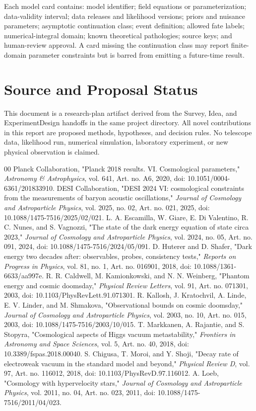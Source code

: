 \documentclass[conference]{IEEEtran}
\begin{document}
Each model card contains: model identifier; field equations or parameterization; data-validity interval; data releases and likelihood versions; priors and nuisance parameters; asymptotic continuation class; event definition; allowed fate labels; numerical-integral domain; known theoretical pathologies; source keys; and human-review approval. A card missing the continuation class may report finite-domain parameter constraints but is barred from emitting a future-time result.

\section{Source and Proposal Status}

This document is a research-plan artifact derived from the Survey, Idea, and ExperimentDesign handoffs in the same project directory. All novel contributions in this report are proposed methods, hypotheses, and decision rules. No telescope data, likelihood run, numerical simulation, laboratory experiment, or new physical observation is claimed.

\begin{thebibliography}{00}
 Planck Collaboration, "Planck 2018 results. VI. Cosmological parameters," \emph{Astronomy \& Astrophysics}, vol. 641, Art. no. A6, 2020, doi: 10.1051/0004-6361/201833910.
 DESI Collaboration, "DESI 2024 VI: cosmological constraints from the measurements of baryon acoustic oscillations," \emph{Journal of Cosmology and Astroparticle Physics}, vol. 2025, no. 02, Art. no. 021, 2025, doi: 10.1088/1475-7516/2025/02/021.
 L. A. Escamilla, W. Giare, E. Di Valentino, R. C. Nunes, and S. Vagnozzi, "The state of the dark energy equation of state circa 2023," \emph{Journal of Cosmology and Astroparticle Physics}, vol. 2024, no. 05, Art. no. 091, 2024, doi: 10.1088/1475-7516/2024/05/091.
 D. Huterer and D. Shafer, "Dark energy two decades after: observables, probes, consistency tests," \emph{Reports on Progress in Physics}, vol. 81, no. 1, Art. no. 016901, 2018, doi: 10.1088/1361-6633/aa997e.
 R. R. Caldwell, M. Kamionkowski, and N. N. Weinberg, "Phantom energy and cosmic doomsday," \emph{Physical Review Letters}, vol. 91, Art. no. 071301, 2003, doi: 10.1103/PhysRevLett.91.071301.
 R. Kallosh, J. Kratochvil, A. Linde, E. V. Linder, and M. Shmakova, "Observational bounds on cosmic doomsday," \emph{Journal of Cosmology and Astroparticle Physics}, vol. 2003, no. 10, Art. no. 015, 2003, doi: 10.1088/1475-7516/2003/10/015.
 T. Markkanen, A. Rajantie, and S. Stopyra, "Cosmological aspects of Higgs vacuum metastability," \emph{Frontiers in Astronomy and Space Sciences}, vol. 5, Art. no. 40, 2018, doi: 10.3389/fspas.2018.00040.
 S. Chigusa, T. Moroi, and Y. Shoji, "Decay rate of electroweak vacuum in the standard model and beyond," \emph{Physical Review D}, vol. 97, Art. no. 116012, 2018, doi: 10.1103/PhysRevD.97.116012.
 A. Loeb, "Cosmology with hypervelocity stars," \emph{Journal of Cosmology and Astroparticle Physics}, vol. 2011, no. 04, Art. no. 023, 2011, doi: 10.1088/1475-7516/2011/04/023.
\end{thebibliography}
\end{document}
